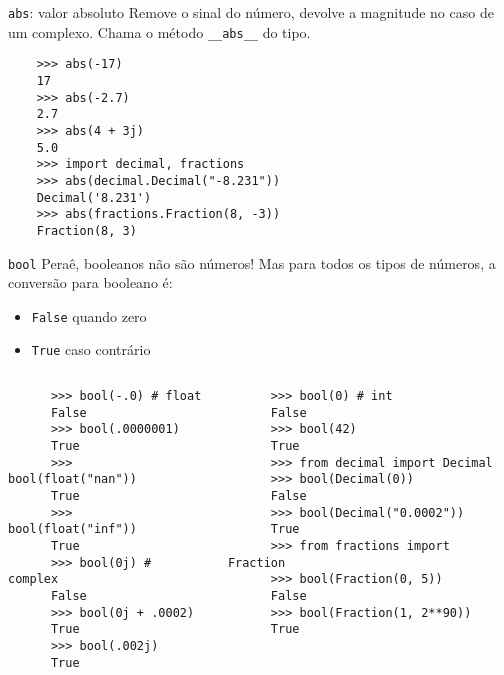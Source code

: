 \documentclass[utf8]{beamer}
\begin{document}
\begin{frame}[fragile]{\texttt{abs}: valor absoluto}
  Remove o sinal do número,
  devolve a magnitude no caso de um complexo.
  Chama o método \texttt{__abs__} do tipo.

  \begin{verbatim}
    >>> abs(-17)
    17
    >>> abs(-2.7)
    2.7
    >>> abs(4 + 3j)
    5.0
    >>> import decimal, fractions
    >>> abs(decimal.Decimal("-8.231"))
    Decimal('8.231')
    >>> abs(fractions.Fraction(8, -3))
    Fraction(8, 3)
  \end{verbatim}

\end{frame}


\begin{frame}[fragile]{\texttt{bool}}
  Peraê, booleanos não são números!
  Mas para todos os tipos de números, a conversão para booleano é:

  \begin{itemize}
    \item \texttt{False} quando zero
    \item \texttt{True} caso contrário
  \end{itemize}

  \begin{columns}

    \begin{verbatim}
      >>> bool(-.0) # float
      False
      >>> bool(.0000001)
      True
      >>> bool(float("nan"))
      True
      >>> bool(float("inf"))
      True
      >>> bool(0j) # complex
      False
      >>> bool(0j + .0002)
      True
      >>> bool(.002j)
      True
    \end{verbatim}

    \begin{verbatim}
      >>> bool(0) # int
      False
      >>> bool(42)
      True
      >>> from decimal import Decimal
      >>> bool(Decimal(0))
      False
      >>> bool(Decimal("0.0002"))
      True
      >>> from fractions import Fraction
      >>> bool(Fraction(0, 5))
      False
      >>> bool(Fraction(1, 2**90))
      True
    \end{verbatim}

  \end{columns}
\end{frame}
\end{document}
